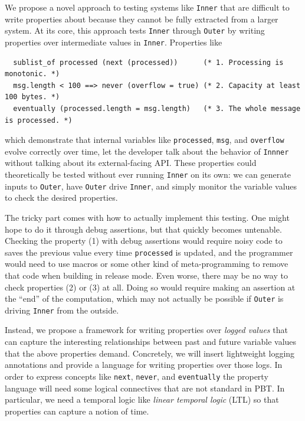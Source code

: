 We propose a novel approach to testing systems like \lstinline{Inner} that are
difficult to write properties about because they cannot be fully extracted from
a larger system.
At its core, this approach tests
\lstinline{Inner} through \lstinline{Outer} by
writing properties over intermediate values in \lstinline{Inner}. Properties like
\begin{lstlisting}
  sublist_of processed (next (processed))      (* 1. Processing is monotonic. *)
  msg.length < 100 ==> never (overflow = true) (* 2. Capacity at least 100 bytes. *)
  eventually (processed.length = msg.length)   (* 3. The whole message is processed. *)
\end{lstlisting}
which demonstrate that internal variables like \lstinline{processed},
\lstinline{msg}, and \lstinline{overflow} evolve correctly over time, let the
developer talk about the behavior of \lstinline{Innner} without talking about
its external-facing API.
These properties could theoretically be tested without ever running
\lstinline{Inner} on its own: we can generate inputs to \lstinline{Outer}, have
\lstinline{Outer} drive \lstinline{Inner}, and simply monitor the variable
values to check the desired properties.

The tricky part comes with how to actually implement this testing. One might
hope to do it through debug assertions, but that quickly becomes untenable.
Checking the property (1) with debug assertions would require noisy code to
saves the previous value every time \lstinline{processed} is updated, and the
programmer would need to use macros or some other kind of meta-programming to
remove that code when building in release mode. Even worse, there may be no way
to check properties (2) or (3) at all. Doing so would require making an
assertion at the ``end'' of the computation, which may not actually be possible
if \lstinline{Outer} is driving \lstinline{Inner} from the outside.

Instead, we propose a framework for writing properties over {\em logged values}
that can capture the interesting relationships between past and future variable
values that the above properties demand.  Concretely, we will insert lightweight
logging annotations and provide a language for writing properties over those
logs. In order to express concepts like \lstinline{next}, \lstinline{never}, and
\lstinline{eventually} the property language will need some logical connectives
that are not standard in PBT.  In particular, we need a temporal logic like {\em
linear temporal logic} (LTL) so that properties can capture a notion of time.

